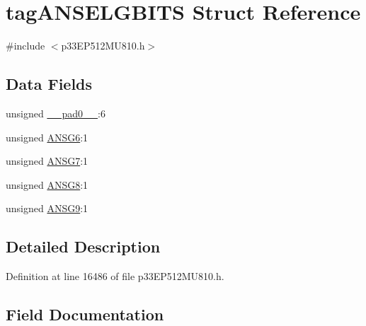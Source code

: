 \hypertarget{structtag_a_n_s_e_l_g_b_i_t_s}{}\section{tag\+A\+N\+S\+E\+L\+G\+B\+I\+TS Struct Reference}
\label{structtag_a_n_s_e_l_g_b_i_t_s}


{\ttfamily \#include $<$p33\+E\+P512\+M\+U810.\+h$>$}

\subsection*{Data Fields}
\begin{DoxyCompactItemize}
\item 
unsigned \hyperlink{structtag_a_n_s_e_l_g_b_i_t_s_adf71f3d8410c1f1dbbc96680a92c49af}{\+\_\+\+\_\+pad0\+\_\+\+\_\+}\+:6
\item 
unsigned \hyperlink{structtag_a_n_s_e_l_g_b_i_t_s_ad3a77e3adad5e6f8f51d36a211fab919}{A\+N\+S\+G6}\+:1
\item 
unsigned \hyperlink{structtag_a_n_s_e_l_g_b_i_t_s_a4dabe0e868c284068fdd802ea9408a0b}{A\+N\+S\+G7}\+:1
\item 
unsigned \hyperlink{structtag_a_n_s_e_l_g_b_i_t_s_a24ca1ee5a0d9bd099893c061cdb322e2}{A\+N\+S\+G8}\+:1
\item 
unsigned \hyperlink{structtag_a_n_s_e_l_g_b_i_t_s_a92f7dba13ac155b496883c10c579635a}{A\+N\+S\+G9}\+:1
\end{DoxyCompactItemize}


\subsection{Detailed Description}


Definition at line 16486 of file p33\+E\+P512\+M\+U810.\+h.



\subsection{Field Documentation}
\mbox{\label{structtag_a_n_s_e_l_g_b_i_t_s_adf71f3d8410c1f1dbbc96680a92c49af}} 
